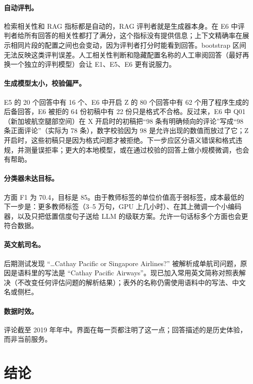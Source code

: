 \documentclass[10pt,twocolumn,a4paper]{article}
\begin{document}
\paragraph{自动评判。}检索相关性和 RAG 指标都是自动的，RAG 评判者就是生成器本身。在 E6 中评判者给所有回答的相关性都打了满分，这个指标没有提供信息；上下文精确率在展示相同片段的配置之间也会变动，因为评判者打分时能看到回答。bootstrap 区间无法反映这类评判误差。人工相关性判断和隐藏配置名称的人工审阅回答（最好再换一个独立的评判模型）会让 E1、E5、E6 更有说服力。

\paragraph{生成模型太小，校验偏严。}E5 的 20 个回答中有 16 个、E6 中开启 Z 的 80 个回答中有 62 个用了程序生成的后备回答，E6 被拒的 64 份初稿中有 22 份只是格式不合格。反过来，E6 中 Q01（新加坡航空腿部空间）在 X 开启时的初稿把“98 条有明确倾向的评论”写成“98 条正面评论”（实际为 78 条），数字校验因为 98 是允许出现的数值而放过了它；Z 开启时，这些初稿只是因为格式问题才被拒绝。下一步应区分语义错误和格式违规，并测量误拒率；更大的本地模型，或在通过校验的回答上做小规模微调，也会有帮助。

\paragraph{分类器未达目标。}方面 F1 为 70.4，目标是 85。由于教师标签的单位价值高于弱标签，成本最低的下一步是：更多教师标签（3--5 万句，GPU 上几小时）、在其上微调一个小编码器，以及只把低置信度句子送给 LLM 的级联方案。允许一句话标多个方面也会更符合数据。

\paragraph{英文航司名。}后期测试发现 “\ldots Cathay Pacific or Singapore Airlines?” 被解析成单航司问题，原因是语料里的写法是 “Cathay Pacific Airways”。现已加入常用英文简称对照表解决（不改变任何评估问题的解析结果）；表外的名称仍需使用语料中的写法、中文名或侧栏。

\paragraph{数据时效。}评论截至 2019 年年中。界面在每一页都注明了这一点；回答描述的是历史体验，而非当前服务。

\section{结论}
\end{document}
